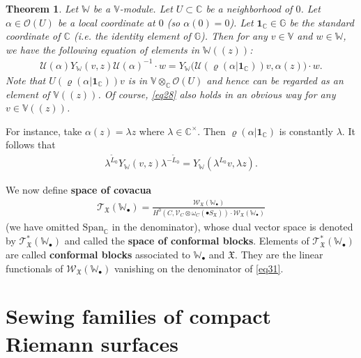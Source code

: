 \documentclass[11pt,b5paper,notitlepage]{article}
\theoremstyle{definition}
\theoremstyle{plain}
\newtheorem{thm}[df]{Theorem}
\newcommand{\fk}{\mathfrak}
\newcommand{\mc}{\mathcal}
\newcommand{\wtd}{\widetilde}
\newcommand{\id}{\mathbf{1}}
\newcommand{\Span}{\mathrm{Span}}
\newcommand{\scr}{\mathscr}
\newcommand{\blt}{\bullet}
\newcommand{\Vbb}{\mathbb V}
\newcommand{\Wbb}{\mathbb W}
\newcommand{\Gbb}{\mathbb G}
\newcommand{\Cbb}{\mathbb C}
\numberwithin{equation}{section}
\begin{document}
\begin{thm}\label{lb14}
	Let $\Wbb$ be a $\Vbb$-module. Let $U\subset\Cbb$ be a neighborhood of $0$. Let $\alpha\in\scr O(U)$ be a local coordinate at $0$ (so $\alpha(0)=0$). Let $\id_\Cbb\in\Gbb$ be the standard coordinate of $\Cbb$ (i.e.  the identity element of $\Gbb$). Then for any $v\in\Vbb$ and $w\in\Wbb$, we have the following equation of elements in $\Wbb((z))$:
	\begin{align}
	\mc U(\alpha)Y_\Wbb(v,z)\mc U(\alpha)^{-1}\cdot w=Y_{\Wbb}\big(\mc U(\varrho(\alpha|\id_\Cbb))v,\alpha(z)\big)\cdot w.\label{eq28}
	\end{align}
	Note that $U(\varrho(\alpha|\id_\Cbb))v$ is in $\Vbb\otimes_{\Cbb}\scr O(U)$ and hence can be regarded as an element of $\Vbb((z))$. Of course, \eqref{eq28} also holds in an obvious way for any $v\in\Vbb((z))$.
\end{thm}


For instance, take $\alpha(z)=\lambda z$ where $\lambda\in\Cbb^\times$. Then $\varrho(\alpha|\id_\Cbb)$ is constantly $\lambda$. It follows that
\begin{align}
\lambda^{\wtd L_0}Y_\Wbb(v,z)\lambda^{-\wtd L_0}=Y_\Wbb(\lambda^{L_0}v,\lambda z).\label{eq63}
\end{align}




We now define  \textbf{space of covacua} 
\begin{gather}
\scr T_{\fk X}(\Wbb_\blt)=\frac{\scr W_{\fk X}(\Wbb_\blt)}{H^0(C,\scr V_C\otimes\omega_C(\blt S_{\fk X}))\cdot \scr W_{\fk X}(\Wbb_\blt)}\label{eq31}
\end{gather}
(we have omitted $\Span_\Cbb$ in the denominator), whose dual vector space is denoted by $\scr T_{\fk X}^*(\Wbb_\blt)$ \index{T@$\scr T_{\fk X}^*(\Wbb_\blt),\scr T_{\fk X}^*(\Wbb_\blt)(\mc B)$} and called the \textbf{space of conformal blocks}.  Elements of $\scr T_{\fk X}^*(\Wbb_\blt)$ are called \textbf{conformal blocks} associated to $\Wbb_\blt$ and $\fk X$. They are the linear functionals of $\scr W_{\fk X}(\Wbb_\blt)$ vanishing on the denominator of \eqref{eq31}.














\section{Sewing families of compact Riemann surfaces}\label{lb6}
\end{document}
